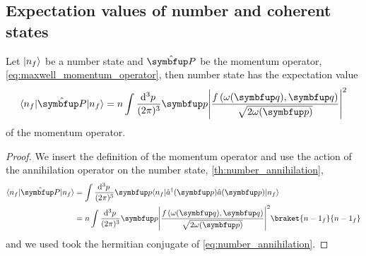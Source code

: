 \subsection{Expectation values of number and coherent states}

\begin{lemma}
	Let $\lvert n_f\rangle$ be a number state and $\vu{P}$ be the momentum operator, \cref{eq:maxwell_momentum_operator}, then number state has the expectation value
	\begin{equation}
		\bra{n_f}
		\vu{P}
		\ket{n_f}
		=
		n
		\int\frac{\dd[3]{p}}{(2\pi)^3}
		\vb{p}
		\abs*{\frac{f\left(\omega(\vb{q}),\vb{q}\right)}{\sqrt{2\omega(\vb{p})}}}^2
	\end{equation}
	of the momentum operator.
\end{lemma}
\begin{proof}
	We insert the definition of the momentum operator and use the action of the annihilation operator on the number state, \cref{th:number_annihilation},
	\begin{equation}
		\begin{split}
			\bra{n_f}
			\vu{P}
			\ket{n_f}
			&=
			\int\frac{\dd[3]{p}}{(2\pi)^3}
			\vb{p}
			\bra{n_f}
			\hat{a}^\dagger(\vb{p})
			\hat{a}(\vb{p})
			\ket{n_f}
			\\
			&=
			n
			\int\frac{\dd[3]{p}}{(2\pi)^3}
			\vb{p}
			\abs*{\frac{f\left(\omega(\vb{q}),\vb{q}\right)}{\sqrt{2\omega(\vb{p})}}}^2
			\braket{{n-1}_f}{{n-1}_f}
		\end{split}
	\end{equation}
	and we used took the hermitian conjugate of \cref{eq:number_annihilation}.
\end{proof}

